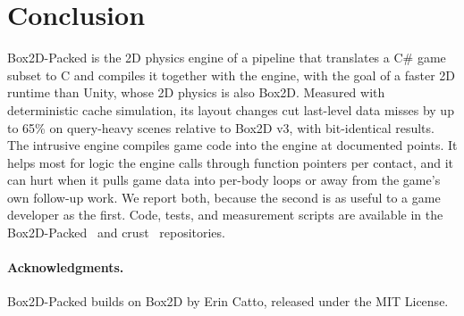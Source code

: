 \documentclass[11pt]{article}
\begin{document}
\section{Conclusion}

Box2D-Packed is the 2D physics engine of a pipeline that translates a C\# game subset to C and
compiles it together with the engine, with the goal of a faster 2D runtime than Unity, whose 2D
physics is also Box2D. Measured with deterministic cache simulation, its layout changes cut
last-level data misses by up to 65\% on query-heavy scenes relative to Box2D v3, with bit-identical
results. The intrusive engine compiles game code into the engine at documented points. It helps
most for logic the engine calls through function pointers per contact, and it can hurt when it
pulls game data into per-body loops or away from the game's own follow-up work. We report both,
because the second is as useful to a game developer as the first. Code, tests, and measurement
scripts are available in the Box2D-Packed~\cite{box2d_packed} and crust~\cite{crust} repositories.

\paragraph{Acknowledgments.} Box2D-Packed builds on Box2D by Erin Catto, released under the MIT
License.



\end{document}
